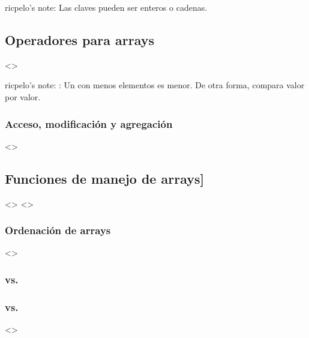 \documentclass[a4paper,12pt,spanish]{sphinxmanual}
\begin{document}
ricpelo’s note: Las claves pueden ser enteros o cadenas.


\subsection{Operadores para arrays}
\label{\detokenize{php:operadores-para-arrays}}
\textless{}\textgreater{}

ricpelo’s note: : Un  con menos elementos es
menor. De otra forma, compara valor por valor.


\subsubsection{Acceso, modificación y agregación}
\label{\detokenize{php:acceso-modificacion-y-agregacion}}
\textless{}\textgreater{}


\subsection{Funciones de manejo de arrays{]}}
\label{\detokenize{php:funciones-de-manejo-de-arrays}}
\textless{}\textgreater{}
\textless{}\textgreater{}


\subsubsection{Ordenación de arrays}
\label{\detokenize{php:ordenacion-de-arrays}}
\textless{}\textgreater{}


\subsubsection{}
\label{\detokenize{php:print-r}}

\subsubsection{ vs. }
\label{\detokenize{php:vs-array-merge}}

\subsubsection{ vs. }
\label{\detokenize{php:isset-vs-array-key-exists}}
\textless{}\textgreater{}
\end{document}
